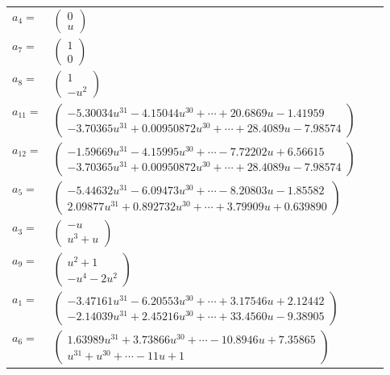 \documentclass[1p]{elsarticle_modified}
\theoremstyle{definition}
\begin{document}
\begin{tabular}{m{7pt} m{180pt} m{7pt} m{180pt} }
\flushright $a_{4}=$&$\begin{pmatrix}0\\u\end{pmatrix}$ \\
\flushright $a_{7}=$&$\begin{pmatrix}1\\0\end{pmatrix}$ \\
\flushright $a_{8}=$&$\begin{pmatrix}1\\- u^2\end{pmatrix}$ \\
\flushright $a_{11}=$&$\begin{pmatrix}-5.30034 u^{31}-4.15044 u^{30}+\cdots+20.6869 u-1.41959\\-3.70365 u^{31}+0.00950872 u^{30}+\cdots+28.4089 u-7.98574\end{pmatrix}$ \\
\flushright $a_{12}=$&$\begin{pmatrix}-1.59669 u^{31}-4.15995 u^{30}+\cdots-7.72202 u+6.56615\\-3.70365 u^{31}+0.00950872 u^{30}+\cdots+28.4089 u-7.98574\end{pmatrix}$ \\
\flushright $a_{5}=$&$\begin{pmatrix}-5.44632 u^{31}-6.09473 u^{30}+\cdots-8.20803 u-1.85582\\2.09877 u^{31}+0.892732 u^{30}+\cdots+3.79909 u+0.639890\end{pmatrix}$ \\
\flushright $a_{3}=$&$\begin{pmatrix}- u\\u^3+u\end{pmatrix}$ \\
\flushright $a_{9}=$&$\begin{pmatrix}u^2+1\\- u^4-2 u^2\end{pmatrix}$ \\
\flushright $a_{1}=$&$\begin{pmatrix}-3.47161 u^{31}-6.20553 u^{30}+\cdots+3.17546 u+2.12442\\-2.14039 u^{31}+2.45216 u^{30}+\cdots+33.4560 u-9.38905\end{pmatrix}$ \\
\flushright $a_{6}=$&$\begin{pmatrix}1.63989 u^{31}+3.73866 u^{30}+\cdots-10.8946 u+7.35865\\u^{31}+u^{30}+\cdots-11 u+1\end{pmatrix}$ \\

\end{tabular}
\end{document}

